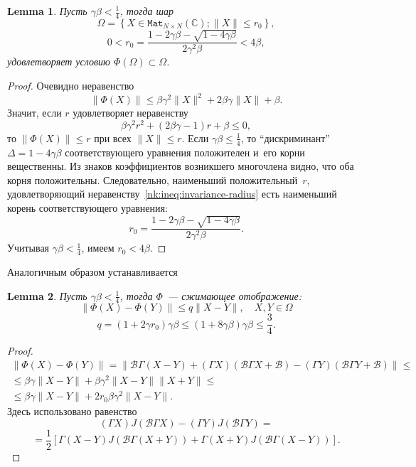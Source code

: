 \documentclass[14pt,a4paper]{extarticle}
\newtheorem{lem}{Lemma}
\theoremstyle{definition}
\begin{document}
\begin{lem}
    Пусть \( \gamma\beta < \frac14\),
    тогда шар
    \[
        \Omega = \left\{ X\in \mathtt{Mat}_{N{\times}N}(\mathbb{C}); \|X\| \leq r_0 \right\}, \]
    \[  0 < r_0 = \frac{1 - 2\gamma\beta - \sqrt{1-4\gamma\beta}}{2\gamma^2\beta} < 4\beta, \]
    удовле\-творяет условию \( \Phi(\Omega)\subset\Omega \).
\end{lem}
\begin{proof}
Очевидно неравенство
    \[ \| \Phi(X) \| \leq
     \beta \gamma^2 \|X\|^2 + 2\beta\gamma\|X\| + \beta. \]
Значит, если \( r \) удовле\-творяет неравенству
    \begin{equation}\label{nk:ineq:invariance-radius}
        \beta \gamma^2 r^2 + (2\beta\gamma - 1)r + \beta \leq 0,
    \end{equation}
    то \( \|\Phi(X)\| \leq r \) при всех \( \|X\| \leq r \).
Если \( \gamma\beta \leq \frac14 \),
    то ``дискриминант'' \( \Delta = 1-4\gamma\beta \)
    соответствующего уравнения положителен и~его корни вещественны.
Из знаков коэффициентов возникшего многочлена видно, что оба корня положительны.
Следовательно, наименьший положительный~\( r \),
    удовле\-творя\-ющий неравенству~\eqref{nk:ineq:invariance-radius}
    есть наименьший корень
    соответствующего уравнения:
    \[ r_0 = \frac{1 - 2\gamma\beta - \sqrt{1-4\gamma\beta}}{2\gamma^2\beta}. \]
Учитывая \( \gamma\beta<\frac14 \), имеем \( r_0 < 4\beta \).
\end{proof}

Аналогичным образом устанавливается
\begin{lem}
    Пусть \(\gamma\beta<\frac14\),
    тогда \( \Phi \)~--- сжимающее отображение:
    \[ \| \Phi(X) - \Phi(Y) \| \leq q \|X - Y\|, \quad X,Y\in\Omega \]
    \[ q = (1+2\gamma r_0) \gamma\beta \leq (1+8\gamma\beta)\gamma\beta \leq \frac34. \]
\end{lem}
\begin{proof}
    \begin{align*} \| \Phi(X) - \Phi(Y) \| = \| \mathcal{B}\Gamma (X-Y) + (\Gamma X)(\mathcal{B}\Gamma X + \mathcal{B})
     - (\Gamma Y)(\mathcal{B} \Gamma Y + \mathcal{B}) \| \leq \\
        \leq
     \beta\gamma\|X-Y\| +
     \beta \gamma^2 \|X-Y\| \|X+Y\| \leq \\
        \leq
     \beta\gamma\|X-Y\| +
      2 r_0 \beta \gamma^2 \|X-Y\|.
    \end{align*}
Здесь использовано равенство
\[ (\Gamma X) J(\mathcal{B}\Gamma X) - (\Gamma Y) J(\mathcal{B}\Gamma Y) =
  \]
 \[= \frac12\left[
        \Gamma(X-Y) J(\mathcal{B}\Gamma(X+Y))
    +   \Gamma(X+Y) J(\mathcal{B}\Gamma(X-Y))
  \right].
\]
\end{proof}
\end{document}
